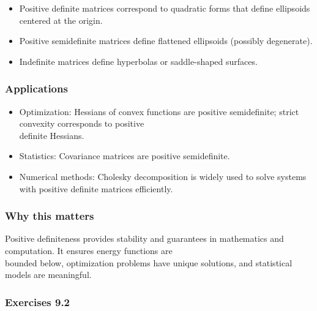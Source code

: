\documentclass[
  12pt,
  a4paper,
]{article}
\begin{document}
\begin{itemize}
\item
  Positive definite matrices correspond to quadratic forms that define
  ellipsoids centered at the origin.
\item
  Positive semidefinite matrices define flattened ellipsoids (possibly
  degenerate).
\item
  Indefinite matrices define hyperbolas or saddle-shaped surfaces.
\end{itemize}

\subsubsection{Applications}\label{applications}

\begin{itemize}
\item
  Optimization: Hessians of convex functions are positive semidefinite;
  strict convexity corresponds to positive\\
  definite Hessians.
\item
  Statistics: Covariance matrices are positive semidefinite.
\item
  Numerical methods: Cholesky decomposition is widely used to solve
  systems with positive definite matrices efficiently.
\end{itemize}

\subsubsection{Why this matters}\label{why-this-matters-33}

Positive definiteness provides stability and guarantees in mathematics
and computation. It ensures energy functions are\\
bounded below, optimization problems have unique solutions, and
statistical models are meaningful.

\subsubsection{Exercises 9.2}\label{exercises-92}
\end{document}
